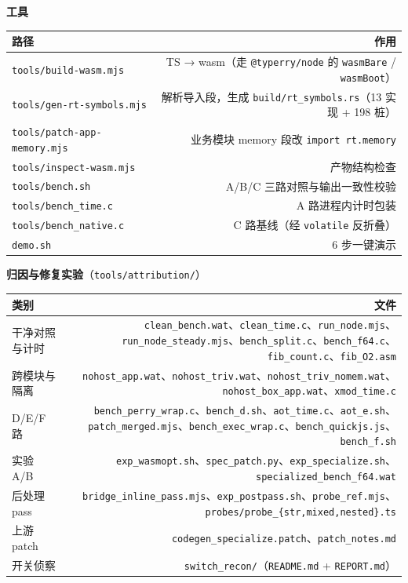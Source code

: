 \documentclass[11pt, a4paper]{article}
\begin{document}
\textbf{工具}


\begin{center}\small\begin{tabular}{lr}
\toprule
路径 & 作用 \\
\midrule
\texttt{tools/build-wasm.mjs} & TS → wasm（走 \texttt{@typerry/node} 的 \texttt{wasmBare} / \texttt{wasmBoot}） \\
\texttt{tools/gen-rt-symbols.mjs} & 解析导入段，生成 \texttt{build/rt\_symbols.rs}（13 实现 + 198 桩） \\
\texttt{tools/patch-app-memory.mjs} & 业务模块 memory 段改 \texttt{import rt.memory} \\
\texttt{tools/inspect-wasm.mjs} & 产物结构检查 \\
\texttt{tools/bench.sh} & A/B/C 三路对照与输出一致性校验 \\
\texttt{tools/bench\_time.c} & A 路进程内计时包装 \\
\texttt{tools/bench\_native.c} & C 路基线（经 \texttt{volatile} 反折叠） \\
\texttt{demo.sh} & 6 步一键演示 \\
\bottomrule
\end{tabular}\end{center}


\textbf{归因与修复实验}（\texttt{tools/attribution/}）


\begin{center}\small\begin{tabular}{lr}
\toprule
类别 & 文件 \\
\midrule
干净对照与计时 & \texttt{clean\_bench.wat}、\texttt{clean\_time.c}、\texttt{run\_node.mjs}、\texttt{run\_node\_steady.mjs}、\texttt{bench\_split.c}、\texttt{bench\_f64.c}、\texttt{fib\_count.c}、\texttt{fib\_O2.asm} \\
跨模块与隔离 & \texttt{nohost\_app.wat}、\texttt{nohost\_triv.wat}、\texttt{nohost\_triv\_nomem.wat}、\texttt{nohost\_box\_app.wat}、\texttt{xmod\_time.c} \\
D/E/F 路 & \texttt{bench\_perry\_wrap.c}、\texttt{bench\_d.sh}、\texttt{aot\_time.c}、\texttt{aot\_e.sh}、\texttt{patch\_merged.mjs}、\texttt{bench\_exec\_wrap.c}、\texttt{bench\_quickjs.js}、\texttt{bench\_f.sh} \\
实验 A/B & \texttt{exp\_wasmopt.sh}、\texttt{spec\_patch.py}、\texttt{exp\_specialize.sh}、\texttt{specialized\_bench\_f64.wat} \\
后处理 pass & \texttt{bridge\_inline\_pass.mjs}、\texttt{exp\_postpass.sh}、\texttt{probe\_ref.mjs}、\texttt{probes/probe\_\{str,mixed,nested\}.ts} \\
上游 patch & \texttt{codegen\_specialize.patch}、\texttt{patch\_notes.md} \\
开关侦察 & \texttt{switch\_recon/}（\texttt{README.md} + \texttt{REPORT.md}） \\
\bottomrule
\end{tabular}\end{center}
\end{document}
